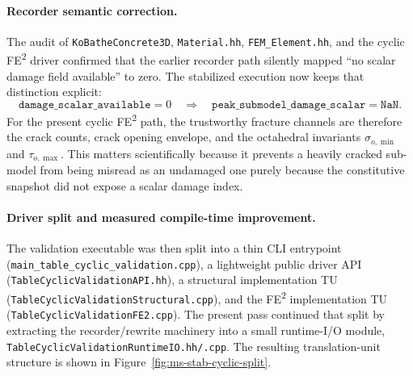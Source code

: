 \paragraph{Recorder semantic correction.}
The audit of \texttt{KoBatheConcrete3D}, \texttt{Material.hh},
\texttt{FEM\_Element.hh}, and the cyclic FE\textsuperscript{2} driver confirmed
that the earlier recorder path silently mapped ``no scalar damage field
available'' to zero.  The stabilized execution now keeps that distinction
explicit:
\begin{equation}
  \texttt{damage\_scalar\_available} = 0
  \quad\Longrightarrow\quad
  \texttt{peak\_submodel\_damage\_scalar} = \texttt{NaN}.
\end{equation}
For the present cyclic FE\textsuperscript{2} path, the trustworthy fracture
channels are therefore the crack counts, crack opening envelope, and the
octahedral invariants \(\sigma_{o,\min}\) and \(\tau_{o,\max}\).  This matters
scientifically because it prevents a heavily cracked sub-model from being
misread as an undamaged one purely because the constitutive snapshot did not
expose a scalar damage index.

\paragraph{Driver split and measured compile-time improvement.}
The validation executable was then split into a thin CLI entrypoint
(\texttt{main\_table\_cyclic\_validation.cpp}), a lightweight public driver API
(\texttt{TableCyclicValidationAPI.hh}), a structural implementation TU
(\texttt{TableCyclicValidationStructural.cpp}), and the FE\textsuperscript{2}
implementation TU (\texttt{TableCyclicValidationFE2.cpp}).  The present pass
continued that split by extracting the recorder/rewrite machinery into a small
runtime-I/O module,
\texttt{TableCyclicValidationRuntimeIO}\allowbreak\texttt{.hh/.cpp}.  The
resulting translation-unit structure is shown in
Figure~\ref{fig:ms-stab-cyclic-split}.


